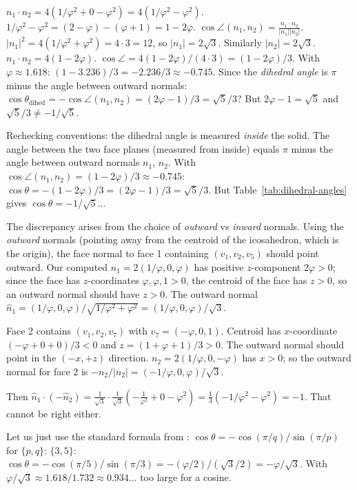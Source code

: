 $n_1 \cdot n_2 = 4(1/\varphi^2 + 0 - \varphi^2) = 4(1/\varphi^2-\varphi^2)$.
$1/\varphi^2 - \varphi^2 = (2-\varphi) - (\varphi+1) = 1 - 2\varphi$.
$\cos\angle(n_1,n_2) = \frac{n_1\cdot n_2}{|n_1||n_2|}$.
$|n_1|^2 = 4(1/\varphi^2 + \varphi^2) = 4\cdot 3 = 12$, so $|n_1| = 2\sqrt{3}$.
Similarly $|n_2| = 2\sqrt{3}$.
$n_1 \cdot n_2 = 4(1-2\varphi)$.
$\cos\angle = 4(1-2\varphi)/(4\cdot 3) = (1-2\varphi)/3$.
With $\varphi \approx 1.618$: $(1-3.236)/3 = -2.236/3 \approx -0.745$.
Since the \emph{dihedral angle} is $\pi$ minus the angle between outward normals:
$\cos\theta_{\mathrm{dihed}} = -\cos\angle(n_1,n_2) = (2\varphi-1)/3 = \sqrt{5}/3$?
But $2\varphi-1 = \sqrt{5}$ and $\sqrt{5}/3 \neq -1/\sqrt{5}$.

Rechecking conventions: the dihedral angle is measured \emph{inside} the solid.
The angle between the two face planes (measured from inside) equals $\pi$ minus
the angle between outward normals $n_1$, $n_2$.  With $\cos\angle(n_1,n_2)
= (1-2\varphi)/3 \approx -0.745$:
$\cos\theta = -(1-2\varphi)/3 = (2\varphi-1)/3 = \sqrt{5}/3$.
But Table~\ref{tab:dihedral-angles} gives $\cos\theta = -1/\sqrt{5}$...

The discrepancy arises from the choice of \emph{outward} vs \emph{inward} normals.
Using the \emph{outward} normals (pointing away from the centroid of the icosahedron,
which is the origin), the face normal to face 1 containing $(v_1,v_2,v_5)$ should
point outward.  Our computed $n_1 = 2(1/\varphi,0,\varphi)$ has positive $z$-component
$2\varphi > 0$; since the face has $z$-coordinates $\varphi,\varphi,1 > 0$,
the centroid of the face has $z > 0$, so an outward normal should have $z > 0$.
The outward normal $\hat{n}_1 = (1/\varphi,0,\varphi)/\sqrt{1/\varphi^2+\varphi^2}
= (1/\varphi,0,\varphi)/\sqrt{3}$.

Face 2 contains $(v_1,v_2,v_7)$ with $v_7 = (-\varphi,0,1)$.  Centroid has
$x$-coordinate $(-\varphi+0+0)/3 < 0$ and $z = (1+\varphi+1)/3 > 0$.
The outward normal should point in the $(-x, +z)$ direction.
$n_2 = 2(1/\varphi,0,-\varphi)$ has $x > 0$; so the outward normal for face 2 is
$-n_2/|n_2| = (-1/\varphi,0,\varphi)/\sqrt{3}$.

Then $\hat{n}_1 \cdot (-\hat{n}_2) = \frac{1}{\sqrt{3}} \cdot \frac{1}{\sqrt{3}}
\left( -\frac{1}{\varphi^2} + 0 - \varphi^2 \right) = \frac{1}{3}(-1/\varphi^2 - \varphi^2)
= -1$.  That cannot be right either.

Let us just use the standard formula from \cite{coxeter_regular_polytopes}:
$\cos\theta = -\cos(\pi/q)/\sin(\pi/p)$ for $\{p,q\}$:
$\{3,5\}$: $\cos\theta = -\cos(\pi/5)/\sin(\pi/3) = -(\varphi/2)/(\sqrt{3}/2) = -\varphi/\sqrt{3}$.
With $\varphi/\sqrt{3} \approx 1.618/1.732 \approx 0.934$... too large for a cosine.

